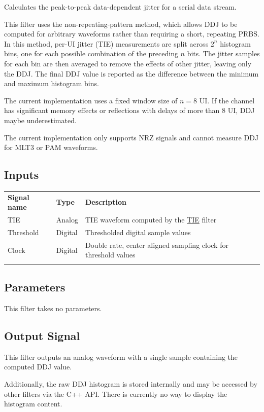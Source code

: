Calculates the peak-to-peak data-dependent jitter for a serial data stream.

This filter uses the non-repeating-pattern method, which allows DDJ to be computed for arbitrary waveforms rather than
requiring a short, repeating PRBS. In this method, per-UI jitter (TIE) measurements are split across $2^n$ histogram
bins, one for each possible combination of the preceding $n$ bits. The jitter samples for each bin are then averaged to
remove the effects of other jitter, leaving only the DDJ.  The final DDJ value is reported as the difference between
the minimum and maximum histogram bins.

The current implementation uses a fixed window size of $n=8$ UI. If the channel has significant memory effects or
reflections with delays of more than 8 UI, DDJ maybe underestimated.

The current implementation only supports NRZ signals and cannot measure DDJ for MLT3 or PAM waveforms.

\subsection{Inputs}

\begin{tabularx}{16cm}{llX}
\thickhline
\textbf{Signal name} & \textbf{Type} & \textbf{Description} \\
\thickhline
TIE & Analog & TIE waveform computed by the \hyperref[filter:tie]{TIE} filter\\
\thinhline
Threshold & Digital & Thresholded digital sample values\\
\thinhline
Clock & Digital & Double rate, center aligned sampling clock for threshold values\\
\thickhline
\end{tabularx}

\subsection{Parameters}

This filter takes no parameters.

\subsection{Output Signal}

This filter outputs an analog waveform with a single sample containing the computed DDJ value.

Additionally, the raw DDJ histogram is stored internally and may be accessed by other filters via the C++ API. There is
currently no way to display the histogram content.

